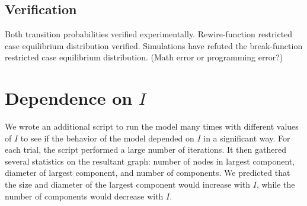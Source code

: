 \documentclass[a4paper,10pt]{article}
\begin{document}
\subsection{Verification}
Both transition probabilities verified experimentally. Rewire-function restricted case equilibrium distribution verified. Simulations have refuted the break-function restricted case equilibrium distribution. (Math error or programming error?)

\section{Dependence on $I$}

We wrote an additional script to run the model many times with different values of $I$ to see if the behavior of the model depended on $I$ in a significant way. For each trial, the script performed a large number of iterations. It then gathered several statistics on the resultant graph: number of nodes in largest component, diameter of largest component, and number of components. We predicted that the size and diameter of the largest component would increase with $I$, while the number of components would decrease with $I$. 
\end{document}

